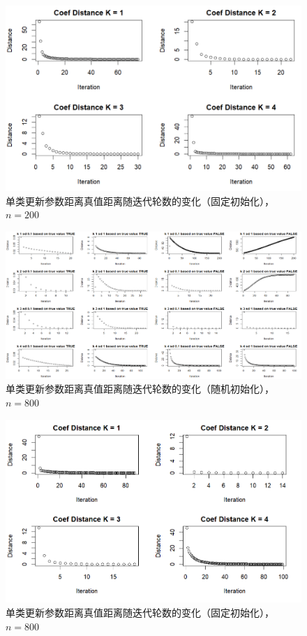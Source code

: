 \documentclass[12pt, a4paper, oneside]{article}
\numberwithin{equation}{section}
\begin{document}
\begin{figure}
	\centering
	\includegraphics[width=0.8\linewidth]{img/one_class_test_ref_n200.png}
	\caption{单类更新参数距离真值距离随迭代轮数的变化（固定初始化），$n=200$}
	\label{fig:one-class-test-ref-n200}
\end{figure}

\begin{figure}
	\centering
	\includegraphics[width=\linewidth]{img/one_class_test_old_n800.png}
	\caption{单类更新参数距离真值距离随迭代轮数的变化（随机初始化），$n=800$}
	\label{fig:one-class-test-old-n800}
\end{figure}

\begin{figure}
	\centering
	\includegraphics[width=0.8\linewidth]{img/one_class_test_ref_n800.png}
	\caption{单类更新参数距离真值距离随迭代轮数的变化（固定初始化），$n=800$}
	\label{fig:one-class-test-ref-n800}
\end{figure}
\end{document}
